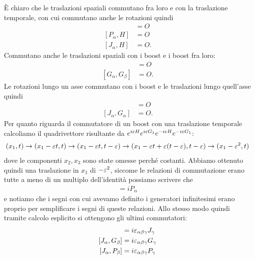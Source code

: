 È chiaro che le traslazioni spaziali commutano fra loro e con la traslazione temporale, con cui commutano anche le rotazioni quindi
\begin{align*}
  [P_\alpha, P_\beta] &= O
  \\
  [P_\alpha, H] &= O
  \\
  [J_\alpha, H] &= O.
\end{align*}
Commutano anche le traslazioni spaziali con i boost e i boost fra loro:
\begin{align*}
  [P_\alpha, G_\beta] &= O
  \\
  [G_\alpha, G_\beta] &= O.
\end{align*}
Le rotazioni lungo un asse commutano con i boost e le traslazioni lungo quell'asse quindi 
\begin{align*}
  [J_\alpha, P_\alpha ] &= O
  \\
  [J_\alpha, G_\alpha ] &= O.
\end{align*}
Per quanto riguarda il commutatore di un boost con una traslazione temporale calcoliamo il quadrivettore risultante da 
$ e^{i\varepsilon H} e^{i \varepsilon G_1} e^{-i\varepsilon H} e^{-i\varepsilon G_1} $:
\begin{align*}
  (x_1, t) \to (x_1 - \varepsilon t , t) \to (x_1 - \varepsilon t, t - \varepsilon) \to (x_1 - \varepsilon t + \varepsilon (t - \varepsilon),  t - \varepsilon) \to (x_1 - \varepsilon^2, t )
\end{align*} 
dove le componenti $ x_2, x_3 $ sono state omesse perché costanti. Abbiamo ottenuto quindi una traslazione in $ x_1 $ di $ -\varepsilon^2 $, siccome 
le relazioni di commutazione erano tutte a meno di un multiplo dell'identità possiamo scrivere che 
\begin{align*}
  [G_\alpha, H] = i P_\alpha
\end{align*}
e notiamo che i segni con cui avevamo definito i generatori infinitesimi erano proprio per semplificare i segni di queste relazioni. 
Allo stesso modo quindi tramite calcolo esplicito si ottengono gli ultimi commutatori:
\begin{align*}
  [J_\alpha, J_\beta] &= i \eps_{\alpha \beta \gamma} J_\gamma
  \\
  [J_\alpha, G_\beta] &= i \eps_{\alpha \beta \gamma} G_\gamma
  \\
  [J_\alpha, P_\beta] &= i \eps_{\alpha \beta \gamma} P_\gamma
\end{align*}

